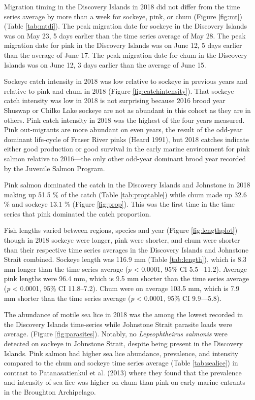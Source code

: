 \documentclass[fleqn,10pt]{wlpeerj} %
\begin{document}
Migration timing in the Discovery Islands in 2018 did not differ from
the time series average by more than a week for sockeye, pink, or chum
(Figure \ref{fig:mt}) (Table \ref{tab:mtdi}). The peak migration date
for sockeye in the Discovery Islands was on May 23, 5 days earlier than
the time series average of May 28. The peak migration date for pink in
the Discovery Islands was on June 12, 5 days earlier than the average of
June 17. The peak migration date for chum in the Discovery Islands was
on June 12, 3 days earlier than the average of June 15.

Sockeye catch intensity in 2018 was low relative to sockeye in previous
years and relative to pink and chum in 2018 (Figure
\ref{fig:catchintensity}). That sockeye catch intensity was low in 2018
is not surprising because 2016 brood year Shuswap or Chilko Lake sockeye
are not as abundant in this cohort as they are in others. Pink catch
intensity in 2018 was the highest of the four years measured. Pink
out-migrants are more abundant on even years, the result of the odd-year
dominant life-cycle of Fraser River pinks (Heard 1991), but 2018 catches
indicate either good production or good survival in the early marine
environment for pink salmon relative to 2016---the only other odd-year
dominant brood year recorded by the Juvenile Salmon Program.

Pink salmon dominated the catch in the Discovery Islands and Johnstone
in 2018 making up 51.5 \% of the catch (Table \ref{tab:proptable}) while
chum made up 32.6 \% and sockeye 13.1 \% (Figure \ref{fig:prop}). This
was the first time in the time series that pink dominated the catch
proportion.

Fish lengths varied between regions, species and year (Figure
\ref{fig:lengthplot}) though in 2018 sockeye were longer, pink were
shorter, and chum were shorter than their respective time series
averages in the Discovery Islands and Johnstone Strait combined. Sockeye
length was 116.9 mm (Table \ref{tab:length}), which is 8.3 mm longer
than the time series average (\emph{p} \textless{} 0.0001, 95\% CI 5.5
--11.2). Average pink lengths were 96.4 mm, which is 9.5 mm shorter than
the time series average (\emph{p} \textless{} 0.0001, 95\% CI
11.8--7.2). Chum were on average 103.5 mm, which is 7.9 mm shorter than
the time series average (\emph{p} \textless{} 0.0001, 95\% CI
9.9---5.8).

The abundance of motile sea lice in 2018 was the among the lowest
recorded in the Discovery Islands time-series while Johnstone Strait
parasite loads were average. (Figure \ref{fig:parasites}). Notably, no
\emph{Lepeophtheirus salmonis} were detected on sockeye in Johnstone
Strait, despite being present in the Discovery Islands. Pink salmon had
higher sea lice abundance, prevalence, and intensity compared to the
chum and sockeye time series average (Table \ref{tab:sealice}) in
contrast to Patanasatienkul et al. (2013) where they found that the
prevalence and intensity of sea lice was higher on chum than pink on
early marine entrants in the Broughton Archipelago.
\end{document}
